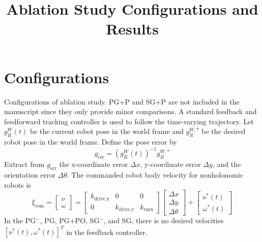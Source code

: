 \documentclass[letterpaper, 10pt]{article}
\begin{document}
\newcommand{\pGap}{\em Potential Gap}
\newcommand{\saferGap}{\em Safer Gap}
\newcommand{\keyhole}{\em Keyhole ZBF}

\def\pgnt{PG$^-$}
\def\pg{PG}
\def\pgpo{PG+PO}
\def\pgp{PG+P}
\def\sgnt{SG$^-$}
\def\sg{SG}
\def\sgp{SG+P}
\def\pgm{PG+M}
\def\sgm{SG+M}
\def\sgmpo{SG+M+PO}

\title{Ablation Study Configurations and Results}
\maketitle

\section{Configurations}

Configurations of ablation study. {\pgp} and {\sgp} are not included in the manuscript since they only provide minor comparisons. A standard feedback and feedforward tracking controller is used to follow the time-varying trajectory. Let $g^W_R(t)$ be the current robot pose in the world frame and $g^{W,*}_R$ be the desired robot pose in the world frame. Define the pose error by
\begin{equation}
g_{\text{err}} = (g^W_R(t))^{-1}g^{W,*}_R
\end{equation}
Extract from $g_{\text{err}}$ the x-coordinate error $\Delta x$, y-coordinate error $\Delta y$, and the orientation error $\Delta \theta$. The commanded robot body velocity for nonholonomic robots is
\begin{equation}
\xi_{\text{com}} = 
\begin{bmatrix}
\nu \\
\omega
\end{bmatrix}
=
\begin{bmatrix}
k_{\text{drive,x}} & 0 & 0 \\
0 & k_{\text{drive,y}} & k_{\text{turn}}
\end{bmatrix}
\begin{bmatrix}
\Delta x \\
\Delta y \\
\Delta \theta
\end{bmatrix}
+
\begin{bmatrix}
\nu^*(t) \\
\omega^*(t)
\end{bmatrix}
\end{equation}
In the {\pgnt}, {\pg}, {\pgpo}, {\sgnt}, and {\sg}, there is no desired velocities $[\nu^*(t), \omega^*(t)]^T$ in the feedback controller.
\end{document}
